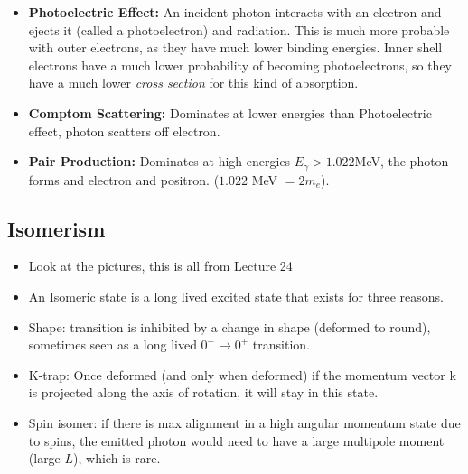 \documentclass[letter]{article}
\begin{document}
\begin{itemize}
\item \textbf{Photoelectric Effect: }An incident photon interacts with an electron and ejects it
  (called a photoelectron) and radiation. This is much more probable
  with outer electrons, as they have much lower binding
  energies. Inner shell electrons have a much lower probability of becoming
  photoelectrons, so they have a much lower \textit{cross section} for
  this kind of absorption.~\cite[Lec. 24]{lecture}
\item \textbf{Comptom Scattering:} Dominates at lower energies than
  Photoelectric effect, photon scatters off electron.~\cite[Lec. 24]{lecture}
\item \textbf{Pair Production:} Dominates at high energies $E_\gamma >
  1.022 $MeV, the photon forms and electron and positron. ($1.022$ MeV
  $=2m_e$).
\end{itemize}

\subsection{Isomerism}

\begin{itemize}
\item Look at the pictures, this is all from Lecture 24~\cite[Lec. 24]{lecture}
\item An Isomeric state is a long lived excited state that exists for
  three reasons.
\item Shape: transition is inhibited by a change in shape (deformed to
  round), sometimes seen as a long lived $0^+ \to 0^+$ transition.
\item K-trap: Once deformed (and only when deformed) if the momentum
  vector k is projected along the axis of rotation, it will stay in
  this state.
\item Spin isomer: if there is max alignment in a high angular
  momentum state due to spins, the emitted photon would need to have a
  large multipole moment (large $L$), which is rare.
\end{itemize}



\end{document}
